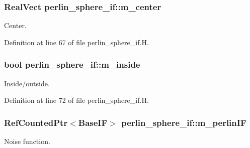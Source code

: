 \subsubsection[{\texorpdfstring{m\+\_\+center}{m_center}}]{\setlength{\rightskip}{0pt plus 5cm}Real\+Vect perlin\+\_\+sphere\+\_\+if\+::m\+\_\+center\hspace{0.3cm}{\ttfamily [protected]}}\hypertarget{classperlin__sphere__if_ab57fb2ddeecb83775ea2663d766b7314}{}\label{classperlin__sphere__if_ab57fb2ddeecb83775ea2663d766b7314}


Center. 



Definition at line 67 of file perlin\+\_\+sphere\+\_\+if.\+H.

\subsubsection[{\texorpdfstring{m\+\_\+inside}{m_inside}}]{\setlength{\rightskip}{0pt plus 5cm}bool perlin\+\_\+sphere\+\_\+if\+::m\+\_\+inside\hspace{0.3cm}{\ttfamily [protected]}}\hypertarget{classperlin__sphere__if_ad768b4a9ceca76fe0d598abda41d5f60}{}\label{classperlin__sphere__if_ad768b4a9ceca76fe0d598abda41d5f60}


Inside/outside. 



Definition at line 72 of file perlin\+\_\+sphere\+\_\+if.\+H.

\subsubsection[{\texorpdfstring{m\+\_\+perlin\+IF}{m_perlinIF}}]{\setlength{\rightskip}{0pt plus 5cm}Ref\+Counted\+Ptr$<$Base\+IF$>$ perlin\+\_\+sphere\+\_\+if\+::m\+\_\+perlin\+IF\hspace{0.3cm}{\ttfamily [protected]}}\hypertarget{classperlin__sphere__if_ad4dd515e2ecefce15080869da1ce670d}{}\label{classperlin__sphere__if_ad4dd515e2ecefce15080869da1ce670d}


Noise function. 



